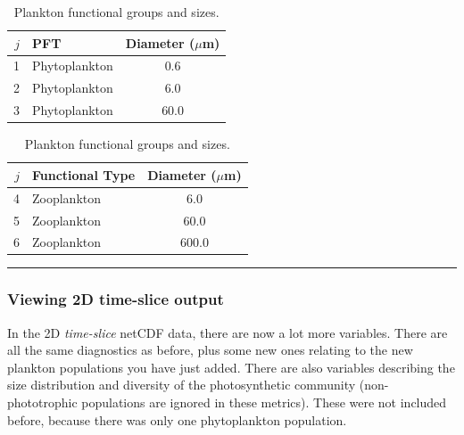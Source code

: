 \vspace{-2mm}
\begin{table}[htp!]
\begin{center}
\caption{Plankton functional groups and sizes.}
\begin{tabular}{rlc}
\hline
$j$     & PFT                   & \multicolumn{1}{r}{Diameter ($\mu$m)}  \\
\hline
1       & Phytoplankton         & 0.6  \\
2       & Phytoplankton         & 6.0  \\
3       & Phytoplankton         & 60.0  \\
\hline
\end{tabular}
\begin{tabular}{rlc}
\hline
$j$     & Functional Type       & \multicolumn{1}{r}{Diameter ($\mu$m)}  \\
\hline
4       & Zooplankton           & 6.0  \\
5       & Zooplankton           & 60.0  \\
6       & Zooplankton           & 600.0  \\
\hline
\end{tabular}
\label{planktonconfig1}
\end{center}
\end{table}
\vspace{-6mm}

\vspace{1mm}
\noindent\rule{4cm}{0.1mm}

\subsubsection{Viewing 2D time-slice output}
\vspace{1mm}

In the 2D \textit{time-slice} netCDF data, there are now a lot more variables. There are all the same diagnostics as before, plus some new ones relating to the new plankton populations you have just added. There are also variables describing the size distribution and diversity of the photosynthetic community (non-phototrophic populations are ignored in these metrics). These were not included before, because there was only one phytoplankton population.

